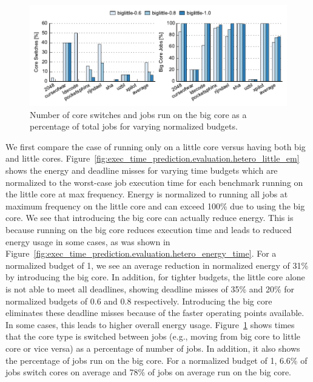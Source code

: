 \begin{figure}
  \begin{center}
    \includegraphics{exec_time_prediction/data/hetero_little_counts.pdf}
    \caption{Number of core switches and jobs run on the big core as a
    percentage of total jobs for varying normalized budgets.}
    \label{fig:exec_time_prediction.evaluation.hetero_little_counts}
  \end{center}
\end{figure}

We first compare the case of running only on a little core versus having both
big and little cores.
Figure~\ref{fig:exec_time_prediction.evaluation.hetero_little_em} shows the
energy and deadline misses for varying time budgets which are normalized to the
worst-case job execution time for each benchmark running on the little core at
max frequency. Energy is normalized to running all jobs at maximum frequency on
the little core and can exceed 100\% due to using the big core. We see that
introducing the big core can actually reduce energy. This is because running on
the big core reduces execution time and leads to reduced energy usage in some cases, as was
shown in Figure~\ref{fig:exec_time_prediction.evaluation.hetero_energy_time}.
For a normalized budget of 1, we see an average reduction in normalized energy
of 31\% by introducing the big core. In addition, for tighter budgets, the
little core alone is not able to meet all deadlines, showing deadline misses of
35\% and 20\% for normalized budgets of 0.6 and 0.8 respectively. Introducing
the big core eliminates these deadline misses because of the faster operating
points available. In some cases, this leads to higher overall energy usage.
Figure~\ref{fig:exec_time_prediction.evaluation.hetero_little_counts} shows
times that the core type is switched between jobs (e.g., moving from big core
to little core or vice versa) as a percentage of number of jobs. In addition,
it also shows the percentage of jobs run on the big core. For a normalized
budget of 1, 6.6\% of jobs switch cores on average and 78\% of jobs on average
run on the big core.

